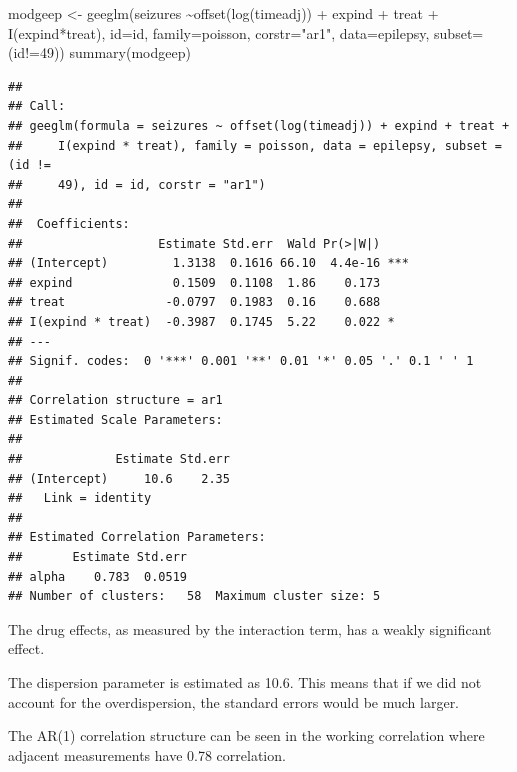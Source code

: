 \documentclass[
  ignorenonframetext,
]{beamer}
\newenvironment{Shaded}{\begin{snugshade}}{\end{snugshade}}
\newcommand{\AttributeTok}[1]{\textcolor[rgb]{0.77,0.63,0.00}{#1}}
\newcommand{\DecValTok}[1]{\textcolor[rgb]{0.00,0.00,0.81}{#1}}
\newcommand{\FunctionTok}[1]{\textcolor[rgb]{0.00,0.00,0.00}{#1}}
\newcommand{\NormalTok}[1]{#1}
\newcommand{\OtherTok}[1]{\textcolor[rgb]{0.56,0.35,0.01}{#1}}
\newcommand{\SpecialCharTok}[1]{\textcolor[rgb]{0.00,0.00,0.00}{#1}}
\newcommand{\StringTok}[1]{\textcolor[rgb]{0.31,0.60,0.02}{#1}}
\begin{document}
\begin{frame}[fragile]{}
\protect\hypertarget{section-26}{}
\tiny

\begin{Shaded}
\begin{Highlighting}[]
\NormalTok{modgeep }\OtherTok{\textless{}{-}} \FunctionTok{geeglm}\NormalTok{(seizures }\SpecialCharTok{\textasciitilde{}}\FunctionTok{offset}\NormalTok{(}\FunctionTok{log}\NormalTok{(timeadj)) }\SpecialCharTok{+}\NormalTok{ expind }\SpecialCharTok{+}\NormalTok{ treat }\SpecialCharTok{+} 
  \FunctionTok{I}\NormalTok{(expind}\SpecialCharTok{*}\NormalTok{treat), }\AttributeTok{id=}\NormalTok{id, }\AttributeTok{family=}\NormalTok{poisson, }\AttributeTok{corstr=}\StringTok{"ar1"}\NormalTok{, }\AttributeTok{data=}\NormalTok{epilepsy, }
  \AttributeTok{subset=}\NormalTok{(id}\SpecialCharTok{!=}\DecValTok{49}\NormalTok{))}
\FunctionTok{summary}\NormalTok{(modgeep)}
\end{Highlighting}
\end{Shaded}

\begin{verbatim}
## 
## Call:
## geeglm(formula = seizures ~ offset(log(timeadj)) + expind + treat + 
##     I(expind * treat), family = poisson, data = epilepsy, subset = (id != 
##     49), id = id, corstr = "ar1")
## 
##  Coefficients:
##                   Estimate Std.err  Wald Pr(>|W|)    
## (Intercept)         1.3138  0.1616 66.10  4.4e-16 ***
## expind              0.1509  0.1108  1.86    0.173    
## treat              -0.0797  0.1983  0.16    0.688    
## I(expind * treat)  -0.3987  0.1745  5.22    0.022 *  
## ---
## Signif. codes:  0 '***' 0.001 '**' 0.01 '*' 0.05 '.' 0.1 ' ' 1
## 
## Correlation structure = ar1 
## Estimated Scale Parameters:
## 
##             Estimate Std.err
## (Intercept)     10.6    2.35
##   Link = identity 
## 
## Estimated Correlation Parameters:
##       Estimate Std.err
## alpha    0.783  0.0519
## Number of clusters:   58  Maximum cluster size: 5
\end{verbatim}
\end{frame}

\begin{frame}{}
\protect\hypertarget{section-27}{}
The drug effects, as measured by the interaction term, has a weakly
significant effect.

The dispersion parameter is estimated as 10.6. This means that if we did
not account for the overdispersion, the standard errors would be much
larger.

The AR(1) correlation structure can be seen in the working correlation
where adjacent measurements have 0.78 correlation.
\end{frame}
\end{document}
